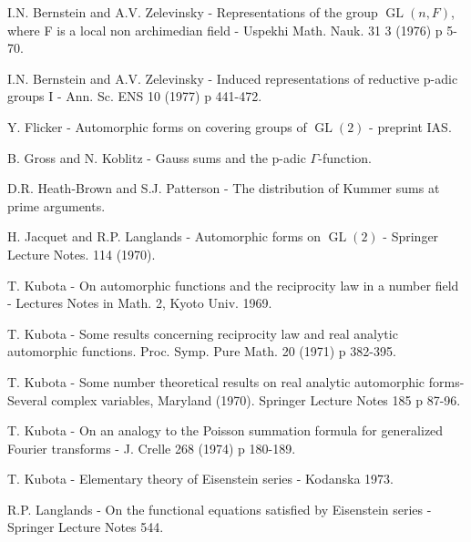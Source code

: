 \documentclass[10pt,a4paper]{article}
\begin{document}
\clearpage
{}
\label{d035-physical-033}
\par\medskip{}\par\smallskip
\par [1] I.N. Bernstein and A.V. Zelevinsky - Representations of the group $\operatorname{GL}(n,F)$, where F is a local non archimedian field - Uspekhi Math. Nauk. 31 3 (1976) p 5-70.\par
\par [2] I.N. Bernstein and A.V. Zelevinsky - Induced representations of reductive p-adic groups I - Ann. Sc. ENS 10 (1977) p 441-472.\par
\par [3] Y. Flicker - Automorphic forms on covering groups of $\operatorname{GL}(2)$ - preprint IAS.\par
\par [4] B. Gross and N. Koblitz - Gauss sums and the p-adic $\Gamma{}$-function.\par
\par [5] D.R. Heath-Brown and S.J. Patterson - The distribution of Kummer sums at prime arguments.\par
\par [6] H. Jacquet and R.P. Langlands - Automorphic forms on $\operatorname{GL}(2)$ - Springer Lecture Notes. 114 (1970).\par
\par [7] T. Kubota - On automorphic functions and the reciprocity law in a number field - Lectures Notes in Math. 2, Kyoto Univ. 1969.\par
\par [8] T. Kubota - Some results concerning reciprocity law and real analytic automorphic functions. Proc. Symp. Pure Math. 20 (1971) p 382-395.\par
\par [9] T. Kubota - Some number theoretical results on real analytic automorphic forms- Several complex variables, Maryland (1970). Springer Lecture Notes 185 p 87-96.\par
\par [10] T. Kubota - On an analogy to the Poisson summation formula for generalized Fourier transforms - J. Crelle 268 (1974) p 180-189.\par
\par [11] T. Kubota - Elementary theory of Eisenstein series - Kodanska 1973.\par
\par [12] R.P. Langlands - On the functional equations satisfied by Eisenstein series - Springer Lecture Notes 544.\par
\end{document}
